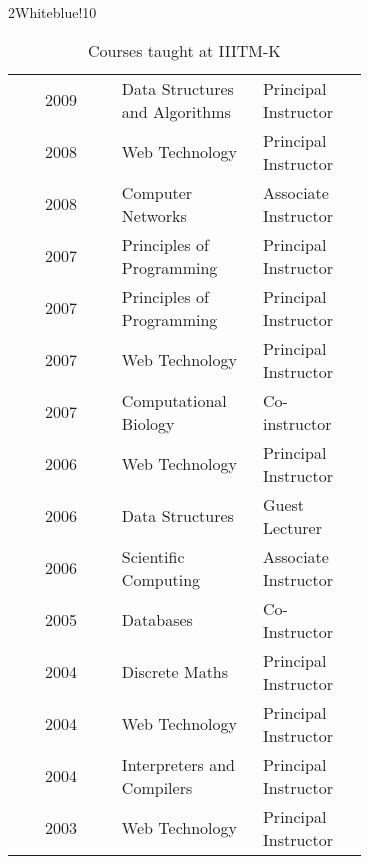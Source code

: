 \documentclass[titlepage, %
11pt, 
]{article}
\begin{document}
\begin{table}
\begin{minipage}{1.0\linewidth}
\rowcolors%
{2}{White}{blue!10}
\setlength\extrarowheight{4pt}
\begin{tabular}%
{|c|p{0.40\linewidth}|p{0.30\linewidth}|}
\hline
\multicolumn{1}{|m{0.30\linewidth}|}{\centering {\bf Year}}&
\multicolumn{1}{m{0.40\linewidth}|}{\centering {\bf Course}}&
\multicolumn{1}{m{0.30\linewidth}|}{\centering {\bf Role}}\\
\hline
2009 & Data Structures and Algorithms  &  Principal Instructor\\
2008 & Web Technology  &  Principal Instructor\\
2008 & Computer Networks  &  Associate Instructor\\
2007 & Principles of Programming  &  Principal Instructor\\
2007 & Principles of Programming  &  Principal Instructor\\
2007 & Web Technology  &  Principal Instructor\\
2007 & Computational Biology  &  Co-instructor\\
2006 & Web Technology & Principal Instructor\\
2006 & Data Structures & Guest Lecturer\\
2006 & Scientific Computing  & Associate Instructor\\
2005 & Databases &  Co-Instructor\\
2004 & Discrete Maths & Principal Instructor\\
2004 & Web Technology & Principal Instructor\\
2004 & Interpreters and Compilers & Principal Instructor\\
2003 & Web Technology & Principal Instructor\\
\hline
\end{tabular}
\end{minipage}
\caption{Courses taught at IIITM-K \label{tbl:courses}}
\end{table}
\end{document}

